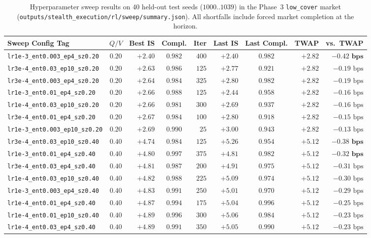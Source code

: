 \documentclass[11pt,a4paper]{article}
\newcommand{\code}[1]{\texttt{#1}}
\begin{document}
\begin{table}[h!]
\centering\footnotesize\setlength{\tabcolsep}{4pt}
\begin{tabular}{l c r c r r c r r}
\toprule
Sweep Config Tag & $Q/V$ & Best IS & Compl. & Iter & Last IS & Last Compl. & TWAP & vs.\ TWAP \\
\midrule
\code{lr1e-3\_ent0.003\_ep4\_sz0.20}  & $0.20$ & $\mathbf{+2.40}$ & $0.982$ & $400$ & $+2.40$ & $0.982$ & $+2.82$ & $\mathbf{-0.42\text{ bps}}$ \\
\code{lr3e-4\_ent0.03\_ep10\_sz0.20}  & $0.20$ & $+2.63$ & $0.986$ & $125$ & $+2.77$ & $0.921$ & $+2.82$ & $-0.19\text{ bps}$ \\
\code{lr3e-4\_ent0.003\_ep4\_sz0.20}  & $0.20$ & $+2.64$ & $0.984$ & $325$ & $+2.80$ & $0.982$ & $+2.82$ & $-0.19\text{ bps}$ \\
\code{lr1e-3\_ent0.01\_ep4\_sz0.20}   & $0.20$ & $+2.66$ & $0.988$ & $125$ & $+2.44$ & $0.958$ & $+2.82$ & $-0.16\text{ bps}$ \\
\code{lr1e-4\_ent0.03\_ep10\_sz0.20}  & $0.20$ & $+2.66$ & $0.981$ & $300$ & $+2.69$ & $0.937$ & $+2.82$ & $-0.16\text{ bps}$ \\
\code{lr3e-4\_ent0.01\_ep4\_sz0.20}   & $0.20$ & $+2.67$ & $0.984$ & $100$ & $+2.80$ & $0.918$ & $+2.82$ & $-0.15\text{ bps}$ \\
\code{lr1e-3\_ent0.003\_ep10\_sz0.20} & $0.20$ & $+2.69$ & $0.990$ & $25$  & $+3.00$ & $0.943$ & $+2.82$ & $-0.13\text{ bps}$ \\
\midrule
\code{lr3e-4\_ent0.03\_ep10\_sz0.40}  & $0.40$ & $\mathbf{+4.74}$ & $0.984$ & $125$ & $+5.26$ & $0.954$ & $+5.12$ & $\mathbf{-0.38\text{ bps}}$ \\
\code{lr1e-3\_ent0.01\_ep4\_sz0.40}   & $0.40$ & $\mathbf{+4.80}$ & $0.997$ & $375$ & $+4.81$ & $0.982$ & $+5.12$ & $\mathbf{-0.32\text{ bps}}$ \\
\code{lr3e-4\_ent0.03\_ep4\_sz0.40}   & $0.40$ & $+4.81$ & $0.987$ & $200$ & $+4.91$ & $0.975$ & $+5.12$ & $-0.31\text{ bps}$ \\
\code{lr1e-4\_ent0.03\_ep10\_sz0.40}  & $0.40$ & $+4.82$ & $0.988$ & $225$ & $+5.09$ & $0.974$ & $+5.12$ & $-0.30\text{ bps}$ \\
\code{lr1e-3\_ent0.003\_ep4\_sz0.40}  & $0.40$ & $+4.83$ & $0.991$ & $250$ & $+5.01$ & $0.970$ & $+5.12$ & $-0.29\text{ bps}$ \\
\code{lr1e-4\_ent0.01\_ep4\_sz0.40}   & $0.40$ & $+4.87$ & $0.994$ & $175$ & $+5.04$ & $0.996$ & $+5.12$ & $-0.25\text{ bps}$ \\
\code{lr1e-4\_ent0.01\_ep10\_sz0.40}  & $0.40$ & $+4.89$ & $0.996$ & $300$ & $+5.06$ & $0.984$ & $+5.12$ & $-0.23\text{ bps}$ \\
\code{lr1e-4\_ent0.03\_ep4\_sz0.40}   & $0.40$ & $+4.89$ & $0.991$ & $350$ & $+5.05$ & $0.990$ & $+5.12$ & $-0.23\text{ bps}$ \\
\bottomrule
\end{tabular}
\caption{Hyperparameter sweep results on 40 held-out test seeds ($1000..1039$) in the Phase~3
\code{low\_cover} market (\code{outputs/stealth\_execution/rl/sweep/summary.json}). All shortfalls include forced market
completion at the horizon.}
\label{tab:rl_sweep}
\end{table}
\end{document}
